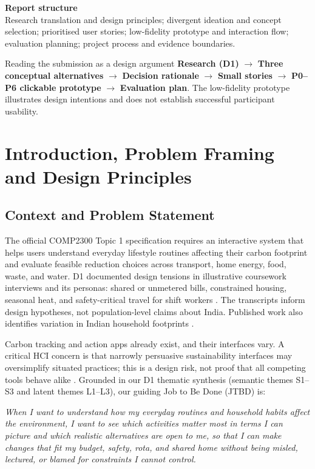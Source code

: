 \documentclass[12pt,a4paper]{article}
\begin{document}
\vspace{0.4cm}
\begin{keybox}
\textbf{\sffamily\color{Navy}Report structure}\\
Research translation and design principles; divergent ideation and concept selection; prioritised user stories; low-fidelity prototype and interaction flow; evaluation planning; project process and evidence boundaries.
\end{keybox}

\begin{chapterfocus}{Reading the submission as a design argument}
\textbf{Research (D1)} $\rightarrow$ \textbf{Three conceptual alternatives} $\rightarrow$ \textbf{Decision rationale} $\rightarrow$ \textbf{Small stories} $\rightarrow$ \textbf{P0--P6 clickable prototype} $\rightarrow$ \textbf{Evaluation plan}. The low-fidelity prototype illustrates design intentions and does not establish successful participant usability.
\end{chapterfocus}

\clearpage
\tableofcontents
\clearpage
{}
\setcounter{page}{1}

\section{Introduction, Problem Framing and Design Principles}

\subsection{Context and Problem Statement}
The official COMP2300 Topic 1 specification requires an interactive system that helps users understand everyday lifestyle routines affecting their carbon footprint and evaluate feasible reduction choices across transport, home energy, food, waste, and water. D1 documented design tensions in illustrative coursework interviews and its personas: shared or unmetered bills, constrained housing, seasonal heat, and safety-critical travel for shift workers \cite{d1report}. The transcripts inform design hypotheses, not population-level claims about India. Published work also identifies variation in Indian household footprints \cite{lee2021}. 

Carbon tracking and action apps already exist, and their interfaces vary. A critical HCI concern is that narrowly persuasive sustainability interfaces may oversimplify situated practices; this is a design risk, not proof that all competing tools behave alike \cite{brynjarsdottir2012}. Grounded in our D1 thematic synthesis (semantic themes S1--S3 and latent themes L1--L3), our guiding Job to Be Done (JTBD) is:
\begin{jtbox}
\itshape
When I want to understand how my everyday routines and household habits affect the environment, I want to see which activities matter most in terms I can picture and which realistic alternatives are open to me, so that I can make changes that fit my budget, safety, rota, and shared home without being misled, lectured, or blamed for constraints I cannot control.
\end{jtbox}
\end{document}
